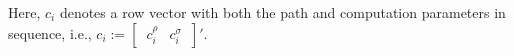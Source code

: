\documentclass[letterpaper,10pt,journal,twoside]{IEEEtran}
\theoremstyle{definition}
\begin{document}
Here, $c_i$ denotes a row vector with both the path and computation parameters in sequence, i.e., $c_i:=[\begin{matrix}\,c_i^\rho & c_i^\sigma\,\end{matrix}]'$. %






\end{document}
